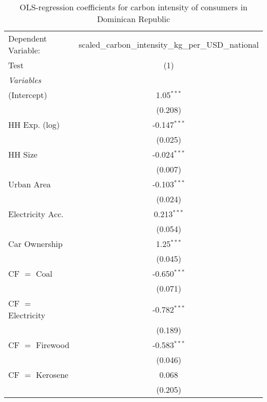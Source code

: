 
\begin{table}[htbp!]
   \centering
   \small
   \begin{adjustbox}{width = 1\textwidth, max height = 0.95\textheight, center}
      \begin{threeparttable}[b]
         \caption{\label{tab:OLS_1_DOM} OLS-regression coefficients for carbon intensity of consumers in Dominican Republic}
         \begin{tabular}{lc}
            \tabularnewline \midrule \midrule
            Dependent Variable: & scaled\_carbon\_intensity\_kg\_per\_USD\_national\\        
            Test                & (1)\\  
            \midrule
            \emph{Variables}\\
            (Intercept)         & 1.05$^{***}$\\   
                                & (0.208)\\   
            HH Exp. (log)       & -0.147$^{***}$\\   
                                & (0.025)\\   
            HH Size             & -0.024$^{***}$\\   
                                & (0.007)\\   
            Urban Area          & -0.103$^{***}$\\   
                                & (0.024)\\   
            Electricity Acc.    & 0.213$^{***}$\\   
                                & (0.054)\\   
            Car Ownership       & 1.25$^{***}$\\   
                                & (0.045)\\   
            CF $=$ Coal         & -0.650$^{***}$\\   
                                & (0.071)\\   
            CF $=$ Electricity  & -0.782$^{***}$\\   
                                & (0.189)\\   
            CF $=$ Firewood     & -0.583$^{***}$\\   
                                & (0.046)\\   
            CF $=$ Kerosene     & 0.068\\   
                                & (0.205)\\   

\end{tabular}
\end{threeparttable}
\end{adjustbox}
\end{table}
